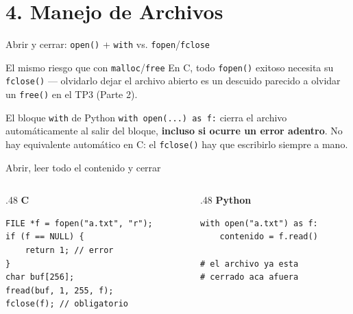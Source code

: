 \documentclass{beamer}
\begin{document}
\section{4. Manejo de Archivos}

\begin{frame}{Abrir y cerrar: \texttt{open()} + \texttt{with} vs. \texttt{fopen}/\texttt{fclose}}
  \begin{alertblock}{El mismo riesgo que con \texttt{malloc}/\texttt{free}}
    En C, todo \texttt{fopen()} exitoso necesita su \texttt{fclose()} —
    olvidarlo dejar el archivo abierto es un descuido parecido a olvidar
    un \texttt{free()} en el TP3 (Parte 2).
  \end{alertblock}
  \begin{block}{El bloque \texttt{with} de Python}
    \texttt{with open(...) as f:} cierra el archivo automáticamente al
    salir del bloque, \textbf{incluso si ocurre un error adentro}. No hay
    equivalente automático en C: el \texttt{fclose()} hay que escribirlo
    siempre a mano.
  \end{block}
\end{frame}

\begin{frame}[fragile]{Abrir, leer todo el contenido y cerrar}
  \begin{columns}[T]
    \begin{column}{.48\textwidth}
      \centering\textbf{C}
      \begin{verbatim}
FILE *f = fopen("a.txt", "r");
if (f == NULL) {
    return 1; // error
}
char buf[256];
fread(buf, 1, 255, f);
fclose(f); // obligatorio
      \end{verbatim}
    \end{column}
    \begin{column}{.48\textwidth}
      \centering\textbf{Python}
      \begin{verbatim}
with open("a.txt") as f:
    contenido = f.read()

# el archivo ya esta
# cerrado aca afuera
      \end{verbatim}
    \end{column}
  \end{columns}
\end{frame}
\end{document}
